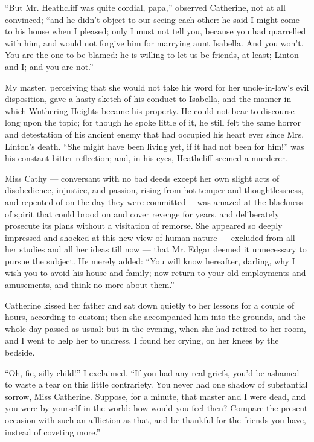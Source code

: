 \par “But Mr. Heathcliff was quite cordial, papa,” observed Catherine, not at all convinced; “and he didn't object to our seeing each other: he said I might come to his house when I pleased; only I must not tell you, because you had quarrelled with him, and would not forgive him for marrying aunt Isabella. And you won't. You are the one to be blamed: he is willing to let us be friends, at least; Linton and I; and you are not.”
\par My master, perceiving that she would not take his word for her uncle-in-law's evil disposition, gave a hasty sketch of his conduct to Isabella, and the manner in which Wuthering Heights became his property. He could not bear to discourse long upon the topic; for though he spoke little of it, he still felt the same horror and detestation of his ancient enemy that had occupied his heart ever since Mrs. Linton's death. “She might have been living yet, if it had not been for him!” was his constant bitter reflection; and, in his eyes, Heathcliff seemed a murderer.
\par Miss Cathy — conversant with no bad deeds except her own slight acts of disobedience, injustice, and passion, rising from hot temper and thoughtlessness, and repented of on the day they were committed— was amazed at the blackness of spirit that could brood on and cover revenge for years, and deliberately prosecute its plans without a visitation of remorse. She appeared so deeply impressed and shocked at this new view of human nature — excluded from all her studies and all her ideas till now — that Mr. Edgar deemed it unnecessary to pursue the subject. He merely added: “You will know hereafter, darling, why I wish you to avoid his house and family; now return to your old employments and amusements, and think no more about them.”
\par Catherine kissed her father and sat down quietly to her lessons for a couple of hours, according to custom; then she accompanied him into the grounds, and the whole day passed as usual: but in the evening, when she had retired to her room, and I went to help her to undress, I found her crying, on her knees by the bedside.
\par “Oh, fie, silly child!” I exclaimed. “If you had any real griefs, you'd be ashamed to waste a tear on this little contrariety. You never had one shadow of substantial sorrow, Miss Catherine. Suppose, for a minute, that master and I were dead, and you were by yourself in the world: how would you feel then? Compare the present occasion with such an affliction as that, and be thankful for the friends you have, instead of coveting more.”
